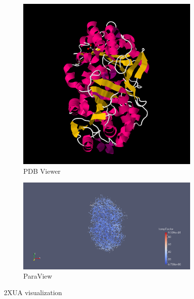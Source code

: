 \documentclass{article}
\begin{document}
\begin{figure}
	\centering
	\begin{subfigure}[h]{0.3\textwidth}
		\includegraphics[width=\textwidth]{pdb-2xua.png}
		\caption{PDB Viewer}
		\label{fig:pdb1}
	\end{subfigure}
	\begin{subfigure}[h]{0.5\textwidth}
		\includegraphics[width=\textwidth]{2xua.png}
		\caption{ParaView}
		\label{fig:pv}
	\end{subfigure}
	\caption{2XUA visualization}\label{fig:9}
\end{figure}
\end{document}
